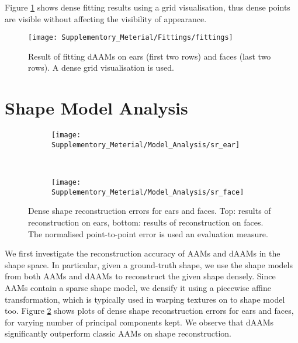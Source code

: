 Figure \ref{fig:fr} shows dense fitting results using a grid visualisation, thus dense points are visible without affecting the visibility of appearance.

\begin{figure}[!t]
\centering
\texttt{[image: Supplementory\_Meterial/Fittings/fittings]}
\caption{Result of fitting dAAMs on ears (first two rows) and faces (last two rows). A dense grid visualisation is used.}
\label{fig:fr}
\end{figure}



\section{Shape Model Analysis}
\label{sec:modelanalysis}


\begin{figure}[!b]
    \centering
    \begin{subfigure}[b]{0.43\textwidth}
            \texttt{[image: Supplementory\_Meterial/Model\_Analysis/sr\_ear]}
    \end{subfigure}
    \\
    \begin{subfigure}[b]{0.43\textwidth}
            \texttt{[image: Supplementory\_Meterial/Model\_Analysis/sr\_face]}
    \end{subfigure}
    \caption{Dense shape reconstruction errors for ears and faces. Top: results of reconstruction on ears, bottom: results of reconstruction on faces. The normalised point-to-point error is used an evaluation measure.}
    \label{fig:rc_face}
\end{figure}


We first investigate the reconstruction accuracy of AAMs and dAAMs in the shape space. In particular, given a ground-truth shape, we use the shape models from both AAMs and dAAMs to reconstruct the given shape densely. Since AAMs contain a sparse shape model, we densify it using a piecewise affine transformation, which is typically used in warping textures on to shape model too. Figure \ref{fig:rc_face} shows plots of dense shape reconstruction errors for ears and faces, for varying number of principal components kept. We observe that dAAMs significantly outperform classic AAMs on shape reconstruction. 


